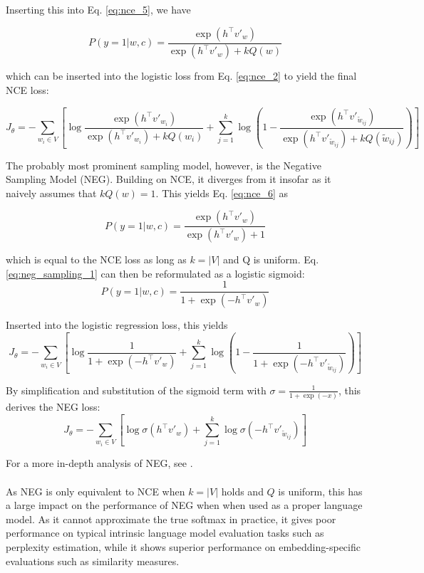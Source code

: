 \documentclass[11pt]{article}
\begin{document}
Inserting this into Eq. \ref{eq:nce_5}, we have

\begin{equation}
P(y=1|w,c) = \frac{\exp(h^{\top}v'_w)}{\exp(h^{\top}v'_w)+kQ(w)}
\label{eq:nce_6}
\end{equation}

which can be inserted into the logistic loss from  Eq. \ref{eq:nce_2} to yield the final NCE loss:


\begin{equation}
J_{\theta}  = - \sum_{w_i \in V} [\log  \frac{\exp(h^{\top}v'_{w_{i}})}{\exp(h^{\top}v'_{w_{i}})+kQ(w_i)} + \sum_{j=1}^{k}\log (1- \frac{\exp(h^{\top}v'_{\tilde{w}_{ij}})}{\exp(h^{\top}v'_{\tilde{w}_{ij}})+kQ({\tilde{w}_{ij}})})]
\label{eq:nce_7}
\end{equation}

The probably most prominent sampling model, however, is the Negative Sampling Model (NEG). Building on NCE, it diverges from it insofar as it naively assumes that $kQ(w)=1$. This yields Eq. \ref{eq:nce_6} as 

\begin{equation}
P(y=1|w,c) = \frac{\exp(h^{\top}v'_w)}{\exp(h^{\top}v'_w)+1}
\label{eq:neg_sampling_1}
\end{equation}

which is equal to the NCE loss as long as $k = |V|$ and Q is uniform. Eq. \ref{eq:neg_sampling_1} can then be reformulated as a logistic sigmoid:
\begin{equation}
P(y=1|w,c) = \frac{1}{1+\exp(-h^{\top}v'_w)}
\label{eq:neg_sampling_2}
\end{equation}

Inserted into the logistic regression loss, this yields
\begin{equation}
J_{\theta}  = - \sum_{w_i \in V} [\log \frac{1}{1+\exp(-h^{\top}v'_w)} 
+ \sum_{j=1}^{k}\log (1- \frac{1}{1+\exp(-h^{\top}v'_{\tilde{w}_{ij}})})]
\label{eq:neg_sampling_3}
\end{equation}

By simplification and substitution of the sigmoid term with $\sigma = \frac{1}{1+\exp(-x)}$, this derives the NEG loss:
\begin{equation}
J_{\theta}  = - \sum_{w_i \in V} [\log \sigma(h^{\top}v'_w)
+ \sum_{j=1}^{k}\log \sigma(-h^{\top}v'_{\tilde{w}_{ij}})]
\label{eq:neg_sampling_3}
\end{equation}

For a more in-depth analysis of NEG, see \cite{goldberg2014word2vec}.
\\\\As NEG is only equivalent to NCE when $k = |V|$ holds and $Q$ is uniform, this has a large impact on the performance of NEG when when used as a proper language model. As it cannot approximate the true softmax in practice, it gives poor performance on typical intrinsic language model evaluation tasks such as perplexity estimation, while it shows superior performance on embedding-specific evaluations such as similarity measures.
\end{document}

